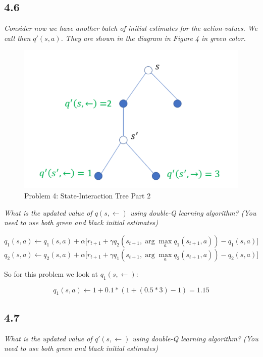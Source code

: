 \documentclass{article}
\begin{document}
\subsection*{4.6}
\textit{Consider now we have another batch of initial estimates for the action-values. We call then $q'(s,a)$. They are shown in the diagram in Figure 4 in green color.}

\begin{figure}
    \centering
    \includegraphics[width=.8\linewidth]{imgs/midterm.4.2.png}
    \caption{Problem 4: State-Interaction Tree Part 2}
\end{figure}

\textit{What is the updated value of $q(s, \leftarrow)$ using double-Q learning algorithm? (You need to use both green and black initial estimates)}

\begin{equation}
    q_{1}(s, a) \leftarrow q_{1}(s, a) + \alpha \bigl[r_{t+1} + \gamma q_{2}(s_{t+1}, \arg\max_{a} q_{1}(s_{t+1},a)) - q_{1}(s, a) \bigr]
\end{equation}
\begin{equation}
    q_{2}(s, a) \leftarrow q_{2}(s, a) + \alpha \bigl[r_{t+1} + \gamma q_{1}(s_{t+1}, \arg\max_{a} q_{2}(s_{t+1},a))- q_{2}(s, a) \bigr]
\end{equation}

So for this problem we look at $q_1(s,\leftarrow)$:

\begin{equation}
    q_1(s,a) \leftarrow 1 + 0.1 * (1 + (0.5* 3) - 1  ) = 1.15
\end{equation}

\subsection*{4.7}

\textit{What is the updated value of $q'(s,\leftarrow)$ using double-Q learning algorithm? (You need to use both green and black initial estimates)}
\end{document}
